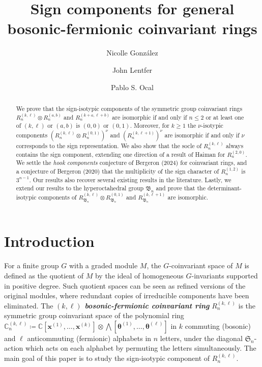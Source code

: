\documentclass[11pt, reqno]{amsart}
\author[N. González]{Nicolle González}
\author[J. Lentfer]{John Lentfer}
\author[P.S. Ocal]{Pablo S. Ocal}
\theoremstyle{definition}
\theoremstyle{remark}
\numberwithin{equation}{section}
\newcommand{\0}{\emptyset}
\newcommand{\C}{\mathbb{C}}
\renewcommand{\S}{\mathfrak{S}}
\newcommand{\newword}[1]{\emph{\textbf{#1}}}
\begin{document}
\title{
Sign components for general bosonic-fermionic coinvariant rings
}

\begin{abstract}
    We prove that the sign-isotypic components of the symmetric group coinvariant rings 
    $R_n^{(k,\ell)} \otimes R_n^{(a,b)}$ and $R_n^{(k+a,\ell+b)}$ 
    are isomorphic if and only if $n \leq 2$ or at least one of $(k,\ell)$ or $(a,b)$ is $(0,0)$ or $(0,1)$.
    Moreover, for $k \geq 1$ the $\nu$-isotypic components $(R_n^{(k,\ell)} \otimes R_n^{(0,1)})^\nu$ and $(R_n^{(k,\ell+1)})^\nu$ 
    are isomorphic if and only if $\nu$ corresponds to the sign representation. 
    We also show that the socle of $R_n^{(k,\ell)}$ always contains the sign component, 
    extending one direction of a result of Haiman for $R_n^{(2,0)}$.
    We settle the \emph{hook components} conjecture of Bergeron (2024) 
    for coinvariant rings,
    and a conjecture of Bergeron (2020) that the multiplicity of the sign character 
    of $R_n^{(1,2)}$ is $3^{n-1}$. 
    Our results also recover several existing results in the literature. 
    Lastly, we extend our results to the hyperoctahedral group ${\mathfrak{B}_n}$ 
    and prove that the determinant-isotypic components of 
    $R_{\mathfrak{B}_n}^{(k,\ell)} \otimes R_{\mathfrak{B}_n}^{(0,1)}$ and $R_{\mathfrak{B}_n}^{(k,\ell+1)}$ 
    are isomorphic. 
\end{abstract}

\maketitle
\tableofcontents

\section{Introduction}

For a finite group $G$ with a graded module $M$, the $G$-coinvariant space of $M$ is
defined as the quotient of $M$ by the ideal of homogeneous 
$G$-invariants supported in positive degree. 
Such quotient spaces can be seen as refined versions of the original modules, 
where redundant copies of irreducible components have been eliminated. 
The \newword{$(k,\ell)$ bosonic-fermionic coinvariant ring} $R_n^{(k,\ell)}$ 
is the symmetric group coinvariant space of the polynomial ring 
$\C_n^{(k,\ell)} \coloneqq \C[\bm{x}^{(1)}, \ldots, \bm{x}^{(k)}] \otimes 
\bigwedge[\bm{\theta}^{(1)}, \ldots, \bm{\theta}^{(\ell)}]$ 
in $k$ commuting (bosonic) and $\ell$ anticommuting (fermionic) alphabets in $n$ letters, 
under the diagonal $\S_n$-action which acts on each alphabet 
by permuting the letters simultaneously. The main goal of this paper is to study 
the sign-isotypic component of $R_n^{(k,\ell)}$. 
\end{document}
